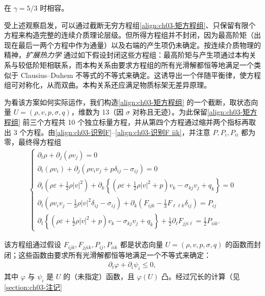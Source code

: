 ﻿\documentclass[../../main.tex]{subfiles}
\begin{document}
在 $\gamma=5/3$ 时相容。

受上述观察启发，可以通过截断无穷方程组\eqref{align:ch03-矩方程组}、只保留有限个方程来构造完整的连续介质理论层级。但所得方程组并不封闭，因为最高阶矩（出现在最后一两个方程中作为通量）以及右端的产生项仍未确定。按连续介质物理的精神，\emph{扩展热力学} 通过如下假设封闭这些方程组：最高阶矩与产生项通过本构关系与较低阶矩相联系，而本构关系由要求方程组的所有光滑解都恒等地满足一个类似于 Clausius--Duhem 不等式的不等式来确定。这诱导出一个伴随平衡律，使方程组可对称化，从而双曲。本构关系还应满足物质标架无差异原理。

为看该方案如何实际运作，我们构造\eqref{align:ch03-矩方程组} 的一个截断，取状态向量 $U=(\rho,v,p,\sigma,q)$，维数为 13（因 $\sigma$ 对称且无迹）。为此保留\eqref{align:ch03-矩方程组} 前三个方程共 10 个独立标量方程，并从第四个方程通过缩并两个指标再取出 3 个方程。由\eqref{align:ch03-识别F}--\eqref{align:ch03-识别F iik}，并注意 $P,P_{i},P_{ii}$ 都为零，最终得方程组
\begin{align}
\begin{cases}
\partial_{t}\rho+\partial_{j}(\rho v_{j})=0\\
\partial_{t}(\rho v_{i})+\partial_{j}(\rho v_{i}v_{j}+p\delta_{ij}-\sigma_{ij})=0\\
\partial_{t}\left(\rho\varepsilon+\frac{1}{2}\rho|v|^{2}\right)+\partial_{k}\left\{\left(\rho\varepsilon+\frac{1}{2}\rho|v|^{2}+p\right)v_{k}-\sigma_{kj}v_{j}+q_{k}\right\}=0\\
\partial_{t}\left(\rho v_{i}v_{j}-\frac{1}{3}\rho|v|^{2}\delta_{ij}-\sigma_{ij}\right)+\partial_{k}\left(F_{ijk}-\frac{1}{3}F_{\ell\ell k}\delta_{ij}\right)=P_{ij}\\
\partial_{t}\left\{\left(\rho\varepsilon+\frac{1}{2}\rho|v|^{2}+p\right)v_{k}-\sigma_{kj}v_{j}+q_{k}\right\}+\frac{1}{2}\partial_{\ell}F_{jj i\ell}=\frac{1}{2}P_{iik}.
\end{cases}
\label{align:ch03-扩展热力学系统}
\end{align}

该方程组通过假设 $F_{ijk},F_{jjik},P_{ij},P_{iik}$ 都是状态向量 $U=(\rho,v,p,\sigma,q)$ 的函数而封闭；这些函数由要求所有光滑解都恒等地满足一个不等式来确定：
\begin{align}
\partial_{t}\varphi+\partial_{i}\psi_{i}\leqslant0,
\label{align:ch03-扩展热力学熵不等式}
\end{align}
其中 $\varphi$ 与 $\psi_{i}$ 是 $U$ 的（未指定）函数，且 $\varphi(U)$ 凸。经过冗长的计算（见\cref{section:ch03-注记}%
\end{document}
